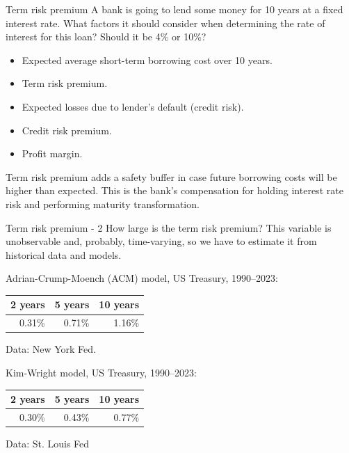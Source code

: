 \documentclass{beamer}
\begin{document}
\begin{frame}{Term risk premium}
\justify
A bank is going to lend some money for 10 years at a fixed interest rate. What factors it should consider when determining the rate of interest for this loan? Should it be 4\% or 10\%?

\begin{itemize}
\justifying
\item Expected average short-term borrowing cost over 10 years.
\item Term risk premium.
\item Expected losses due to lender's default (credit risk).
\item Credit risk premium.
\item Profit margin.
\end{itemize}

\justify
Term risk premium adds a safety buffer in case future borrowing costs will be higher than expected. This is the bank's compensation for holding interest rate risk and performing maturity transformation.
\end{frame}



\begin{frame}{Term risk premium - 2}
\justify
How large is the term risk premium? This variable is unobservable and, probably, time-varying, so we have to estimate it from historical data and models.

\justify
 Adrian-Crump-Moench (ACM) model, US Treasury, 1990--2023:

\begin{tabular}{r|r|r}
2 years & 5 years & 10 years \\ \hline
0.31\% & 0.71\% & 1.16\% 
\end{tabular}

Data: New York Fed.

\justify
Kim-Wright model, US Treasury, 1990--2023:

\begin{tabular}{r|r|r}
2 years & 5 years & 10 years \\ \hline
0.30\% & 0.43\% & 0.77\%
\end{tabular}

Data: St. Louis Fed
\end{frame}
\end{document}
